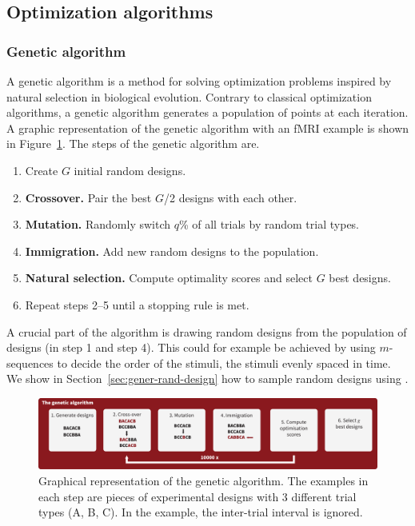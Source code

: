 \documentclass[article]{jss}
\begin{document}
\subsection{Optimization algorithms}

\subsubsection{Genetic algorithm}

A genetic algorithm is a method for solving optimization problems
inspired by natural selection in biological evolution.  Contrary to
classical optimization algorithms, a genetic algorithm generates a
population of points at each iteration.  A graphic representation of
the genetic algorithm with an fMRI example is shown in
Figure~\ref{fig2}.  The steps of the genetic algorithm are.
%
\begin{enumerate}
 \setlength\itemsep{-0.5em}
\item Create $G$ initial random designs.
\item \textbf{Crossover.} Pair the best $G$/2 designs with each other.
\item \textbf{Mutation. }Randomly switch $q$\% of all trials by random trial types.
\item \textbf{Immigration.} Add new random designs to the population.
\item \textbf{Natural selection.}  Compute optimality scores and select $G$ best designs.
\item Repeat steps 2--5 until a stopping rule is met.
\end{enumerate}

A crucial part of the algorithm is drawing random designs from the
population of designs (in step 1 and step 4).  This could for example
be achieved by using $m$-sequences to decide the order of the stimuli,
the stimuli evenly spaced in time.  We show in
Section~\ref{sec:gener-rand-design} how to sample random designs using
.
%
\begin{figure}[t!]
\centering
\includegraphics[scale=0.5]{GA.pdf}
\caption{Graphical representation of the genetic algorithm.  The examples in each step are pieces of experimental designs with 3 different trial types (A, B, C).  In the example, the inter-trial interval is ignored. \label{fig2}}
\end{figure}
\end{document}
